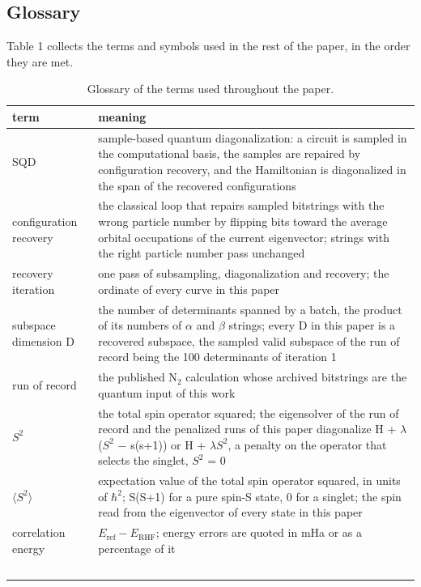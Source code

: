 \documentclass[11pt]{article}
\begin{document}
\subsection{Glossary}\label{sec:2.5}


Table 1 collects the terms and symbols used in the rest of the paper, in the order they are met.


\begin{table}[htbp]
\centering
\caption{Glossary of the terms used throughout the paper.}\label{tab:1}
\footnotesize
\renewcommand{\arraystretch}{1.15}

\begin{tabularx}{\linewidth}{@{}l>{\hsize=1.000\hsize\raggedright\arraybackslash}X@{}}
\toprule
term & meaning \\
\midrule
SQD & sample-based quantum diagonalization: a circuit is sampled in the computational basis, the samples are repaired by configuration recovery, and the Hamiltonian is diagonalized in the span of the recovered configurations \\
configuration recovery & the classical loop that repairs sampled bitstrings with the wrong particle number by flipping bits toward the average orbital occupations of the current eigenvector; strings with the right particle number pass unchanged \\
recovery iteration & one pass of subsampling, diagonalization and recovery; the ordinate of every curve in this paper \\
subspace dimension D & the number of determinants spanned by a batch, the product of its numbers of $\alpha$ and $\beta$ strings; every D in this paper is a recovered subspace, the sampled valid subspace of the run of record being the 100 determinants of iteration 1 \\
run of record & the published N$_2$ calculation whose archived bitstrings are the quantum input of this work \\
$S^{2}$ & the total spin operator squared; the eigensolver of the run of record and the penalized runs of this paper diagonalize H + $\lambda$($S^{2}$ $-$ s(s+1)) or H + $\lambda$$S^{2}$, a penalty on the operator that selects the singlet, $S^{2}$ = 0 \\
$\langle S^{2}\rangle$ & expectation value of the total spin operator squared, in units of $\hbar^2$; S(S+1) for a pure spin-S state, 0 for a singlet; the spin read from the eigenvector of every state in this paper \\
correlation energy & $E_{\mathrm{ref}}-E_{\mathrm{RHF}}$; energy errors are quoted in mHa or as a percentage of it \\
$$
\end{tabularx}
\end{table}
\end{document}
